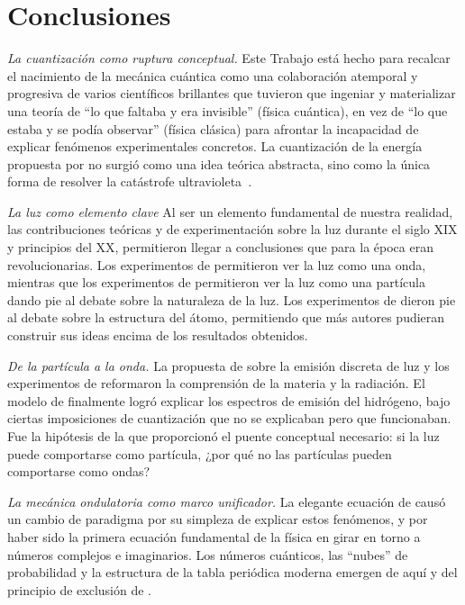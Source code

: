 \documentclass[11pt,a4paper,spanish]{book}
\begin{document}
\chapter{Conclusiones}

\textit{La cuantización como ruptura conceptual.}
Este Trabajo está hecho para recalcar el nacimiento de la mecánica
cuántica como una colaboración atemporal y progresiva de varios
científicos brillantes que tuvieron que ingeniar y materializar una
teoría de ``lo que faltaba y era invisible'' (física cuántica), en
vez de ``lo que estaba y se podía observar'' (física clásica) para
afrontar la incapacidad de explicar fenómenos experimentales
concretos. La cuantización de la
energía propuesta por \cite{planck1900} no surgió como una idea
teórica abstracta, sino como la única forma de resolver la catástrofe
ultravioleta~\citep{rayleigh1900,jeans1905}.

\textit{La luz como elemento clave}
Al ser un elemento fundamental de nuestra realidad, las
contribuciones teóricas y de experimentación sobre la luz durante el
siglo XIX y principios del XX,
permitieron llegar a conclusiones que para la época eran
revolucionarias. Los experimentos de \cite{balmer1885} permitieron
ver la luz como una onda, mientras que los experimentos de
\cite{einsteina1905_photoelectric} permitieron ver la luz como una
partícula dando pie al debate sobre la naturaleza de la luz.
Los experimentos de \cite{rutherford1911} dieron pie al debate sobre
la estructura del átomo, permitiendo que más autores pudieran
construir sus ideas encima de los resultados obtenidos.

\textit{De la partícula a la onda.}
La propuesta de \cite{einsteina1905_photoelectric} sobre la emisión
discreta de luz y los experimentos de \cite{rutherford1911} reformaron la
comprensión de la materia y la radiación. El modelo de
\cite{bohr1913} finalmente logró explicar los espectros de emisión
del hidrógeno, bajo ciertas imposiciones de cuantización que no se
explicaban pero que funcionaban. Fue la
hipótesis de \cite{debroglie1924} la que proporcionó el puente
conceptual necesario: si la luz puede comportarse como partícula,
¿por qué no las
partículas pueden comportarse como ondas?

\textit{La mecánica ondulatoria como marco unificador.}
La elegante ecuación de \cite{schrodinger1926} causó un cambio de
paradigma por su simpleza de explicar estos fenómenos, y por haber
sido la primera ecuación fundamental de la física en girar en torno a
números complejos e imaginarios. Los números cuánticos, las ``nubes''
de probabilidad y la estructura de la tabla periódica moderna emergen
de aquí y del principio de exclusión de \cite{pauli1925}.
\end{document}
